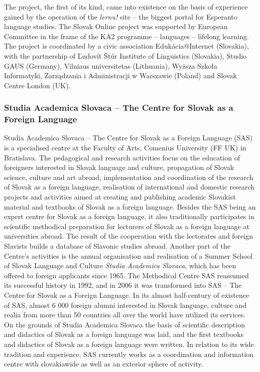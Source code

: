 \begin{multicols}{2}
The project, the first of its kind, came into existence on the basis of experience gained by the operation of the \emph{lernu!}\cite{f7} site – the biggest portal for Esperanto language studies. The Slovak Online project was supported by European Committee in the frame of the KA2 programme – languages – lifelong learning. The project is coordinated by a civic association Edukácia@Internet (Slovakia), with the partnership of Ľudovít Štúr Institute of Linguistics (Slovakia), Studio GAUS (Germany), Vilniaus universitetas (Lithuania), Wyższa Szkoła Informatyki, Zarządzania i Administracji w Warszawie (Poland) and Slovak Centre London (UK).

\subsubsection{Studia Academica Slovaca -- The Centre for Slovak as a Foreign Language}
Studia Academica Slovaca – The Centre for Slovak as a Foreign Language (SAS) is a specialised centre at the Faculty of Arts\cite{f8}, Comenius University (FF UK) in Bratislava. The pedagogical and research activities focus on the education of foreigners interested in Slovak language and culture, propagation of Slovak science, culture and art abroad, implementation and coordination of the research of Slovak as a foreign language, realisation of international and domestic research projects and activities aimed at creating and publishing academic Slovakist material and textbooks of Slovak as a foreign language. Besides the SAS being an expert centre for Slovak as a foreign language, it also traditionally participates in scientific methodical preparation for lecturers of Slovak as a foreign language at universities abroad. The result of the cooperation with the lectorates and foreign Slavists builds a database of Slavonic studies abroad.
Another part of the Centre's activities is the annual organisation and realisation of a Summer School of Slovak Language and Culture \emph{Studia Academica Slovaca}, which has been offered to foreign applicants since 1965. The Methodical Centre SAS reassumed its successful history in 1992, and in 2006 it was transformed into SAS – The Centre for Slovak as a Foreign Language. In its almost half-century of existence of SAS, almost 6 000 foreign alumni interested in Slovak language, culture and realia from more than 50 countries all over the world have  utilized its services. On the grounds of Studia Academica Slovaca the basis of scientific description and didactics of Slovak as a foreign language was laid, and the first textbooks and didactics of Slovak as a foreign language were written. In relation to its wide tradition and experience, SAS currently works as a coordination and information centre with slovakiawide as well as an exterior sphere of activity.


\end{multicols}
